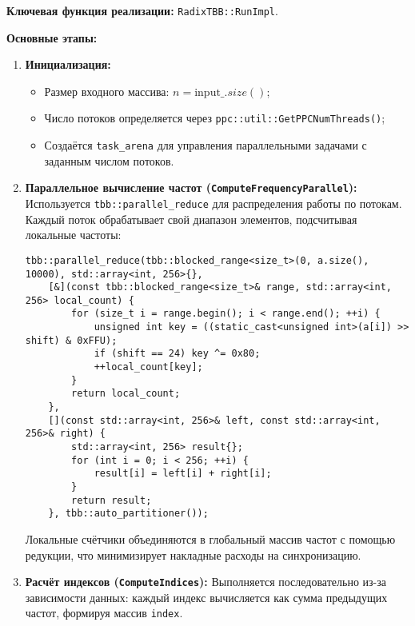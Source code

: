 \documentclass[12pt]{article}
\begin{document}
\textbf{Ключевая функция реализации:} \texttt{RadixTBB::RunImpl}.

\textbf{Основные этапы:}
\begin{enumerate}
  \item \textbf{Инициализация:}
  \begin{itemize}
    \item Размер входного массива: $n = \text{input\_}.size()$;
    \item Число потоков определяется через \texttt{ppc::util::GetPPCNumThreads()};
    \item Создаётся \texttt{task\_arena} для управления параллельными задачами с заданным числом потоков.
  \end{itemize}

  \item \textbf{Параллельное вычисление частот (\texttt{ComputeFrequencyParallel}):}
  Используется \texttt{tbb::parallel\_reduce} для распределения работы по потокам. Каждый поток обрабатывает свой диапазон элементов, подсчитывая локальные частоты:
  \begin{lstlisting}
tbb::parallel_reduce(tbb::blocked_range<size_t>(0, a.size(), 10000), std::array<int, 256>{},
    [&](const tbb::blocked_range<size_t>& range, std::array<int, 256> local_count) {
        for (size_t i = range.begin(); i < range.end(); ++i) {
            unsigned int key = ((static_cast<unsigned int>(a[i]) >> shift) & 0xFFU);
            if (shift == 24) key ^= 0x80;
            ++local_count[key];
        }
        return local_count;
    },
    [](const std::array<int, 256>& left, const std::array<int, 256>& right) {
        std::array<int, 256> result{};
        for (int i = 0; i < 256; ++i) {
            result[i] = left[i] + right[i];
        }
        return result;
    }, tbb::auto_partitioner());
  \end{lstlisting}
  Локальные счётчики объединяются в глобальный массив частот с помощью редукции, что минимизирует накладные расходы на синхронизацию.

  \item \textbf{Расчёт индексов (\texttt{ComputeIndices}):}
  Выполняется последовательно из-за зависимости данных: каждый индекс вычисляется как сумма предыдущих частот, формируя массив \texttt{index}.


\end{enumerate}
\end{document}
